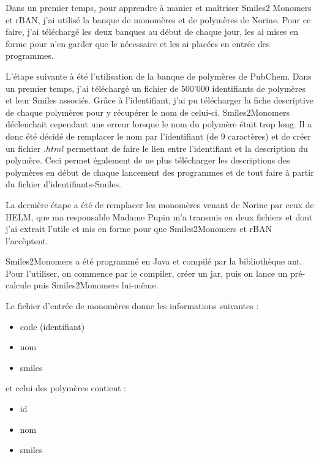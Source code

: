 \documentclass[11pt, a4paper]{report}
\begin{document}
	Dans un premier temps, pour apprendre à manier et maîtriser Smiles2 Monomers et rBAN, j'ai utilisé la banque de monomères et de polymères de Norine. Pour ce faire, j'ai téléchargé les deux banques au début de chaque jour, les ai mises en forme pour n'en garder que le nécessaire et les ai placées en entrée des programmes.
	
	L'étape suivante à été l'utilisation de la banque de polymères de PubChem. Dans un premier temps, j'ai téléchargé un fichier de 500'000 identifiants de polymères et leur Smiles associés. Grâce à l'identifiant, j'ai pu télécharger la fiche descriptive de chaque polymères pour y récupérer le nom de celui-ci. Smiles2Monomers déclenchait cependant une erreur lorsque le nom du polymère était trop long. Il a donc été décidé de remplacer le nom par l'identifiant (de 9 caractères) et de créer un fichier $.html$ permettant de faire le lien entre l'identifiant et la description du polymère. Ceci permet également de ne plus télécharger les descriptions des polymères en début de chaque lancement des programmes et de tout faire à partir du fichier d'identifiants-Smiles.
	
	La dernière étape a été de remplacer les monomères venant de Norine par ceux de HELM, que ma responsable Madame Pupin m'a transmis en deux fichiers et dont j'ai extrait l'utile et mis en forme pour que Smiles2Monomers et rBAN l'accèptent.
	
	Smiles2Monomers a été programmé en Java et compilé par la bibliothèque ant. Pour l'utiliser, on commence par le compiler, créer un jar, puis on lance un pré-calcule puis Smiles2Monomers lui-même.
	
	Le fichier d'entrée de monomères donne les informations suivantes :
	\begin{itemize}
		\item code (identifiant)
		\item nom
		\item smiles
	\end{itemize}
	
	et celui des polymères contient :
	\begin{itemize}
		\item id
		\item nom
		\item smiles
	\end{itemize}
	
\end{document}
